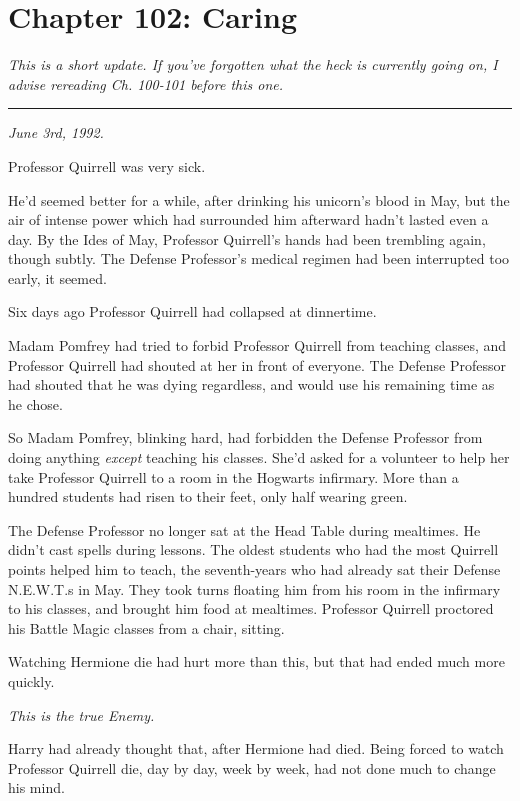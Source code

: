\chapter{Chapter 102: Caring}
\emph{This is a short update. If you've forgotten what the heck is currently going on, I advise rereading Ch. 100-101 before this one.}

\begin{center}\rule{3in}{0.4pt}\end{center}

\emph{June 3rd, 1992.}

Professor Quirrell was very sick.

He'd seemed better for a while, after drinking his unicorn's blood in May, but the air of intense power which had surrounded him afterward hadn't lasted even a day. By the Ides of May, Professor Quirrell's hands had been trembling again, though subtly. The Defense Professor's medical regimen had been interrupted too early, it seemed.

Six days ago Professor Quirrell had collapsed at dinnertime.

Madam Pomfrey had tried to forbid Professor Quirrell from teaching classes, and Professor Quirrell had shouted at her in front of everyone. The Defense Professor had shouted that he was dying regardless, and would use his remaining time as he chose.

So Madam Pomfrey, blinking hard, had forbidden the Defense Professor from doing anything \emph{except} teaching his classes. She'd asked for a volunteer to help her take Professor Quirrell to a room in the Hogwarts infirmary. More than a hundred students had risen to their feet, only half wearing green.

The Defense Professor no longer sat at the Head Table during mealtimes. He didn't cast spells during lessons. The oldest students who had the most Quirrell points helped him to teach, the seventh-years who had already sat their Defense N.E.W.T.s in May. They took turns floating him from his room in the infirmary to his classes, and brought him food at mealtimes. Professor Quirrell proctored his Battle Magic classes from a chair, sitting.

Watching Hermione die had hurt more than this, but that had ended much more quickly.

\emph{This is the true Enemy.}

Harry had already thought that, after Hermione had died. Being forced to watch Professor Quirrell die, day by day, week by week, had not done much to change his mind.

